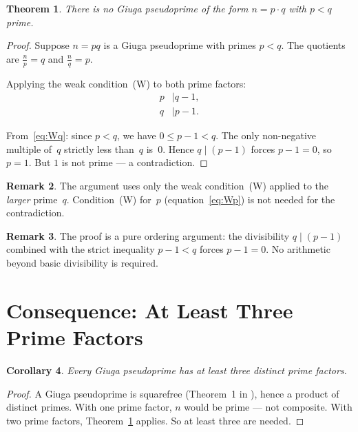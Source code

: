\documentclass[12pt,a4paper]{amsart}
\newtheorem{theorem}{Theorem}[section]
\newtheorem{corollary}[theorem]{Corollary}
\theoremstyle{definition}
\newtheorem{remark}[theorem]{Remark}
\begin{document}
\begin{theorem}
\label{thm:nopq}
There is no Giuga pseudoprime of the form $n = p \cdot q$ with $p < q$ prime.
\end{theorem}

\begin{proof}
Suppose $n = pq$ is a Giuga pseudoprime with primes $p < q$.  The quotients are
$\tfrac{n}{p} = q$ and $\tfrac{n}{q} = p$.

Applying the weak condition~(W) to both prime factors:
\begin{align}
  p &\mid q - 1, \label{eq:Wp} \\
  q &\mid p - 1. \label{eq:Wq}
\end{align}

From~\eqref{eq:Wq}: since $p < q$, we have $0 \le p - 1 < q$.
The only non-negative multiple of~$q$ strictly less than~$q$ is~$0$.
Hence $q \mid (p - 1)$ forces $p - 1 = 0$, so $p = 1$.
But $1$ is not prime — a contradiction.
\end{proof}

\begin{remark}
The argument uses only the weak condition~(W) applied to the \emph{larger} prime~$q$.
Condition~(W) for~$p$ (equation~\eqref{eq:Wp}) is not needed for the contradiction.
\end{remark}

\begin{remark}
The proof is a pure ordering argument: the divisibility $q \mid (p-1)$ combined
with the strict inequality $p - 1 < q$ forces $p - 1 = 0$.  No arithmetic
beyond basic divisibility is required.
\end{remark}

\section{Consequence: At Least Three Prime Factors}

\begin{corollary}
\label{cor:three}
Every Giuga pseudoprime has at least three distinct prime factors.
\end{corollary}

\begin{proof}
A Giuga pseudoprime is squarefree (Theorem~1 in \cite{Ingwer2026sqfree}),
hence a product of distinct primes.  With one prime factor, $n$ would be prime —
not composite.  With two prime factors, Theorem~\ref{thm:nopq} applies.
So at least three are needed.
\end{proof}
\end{document}
